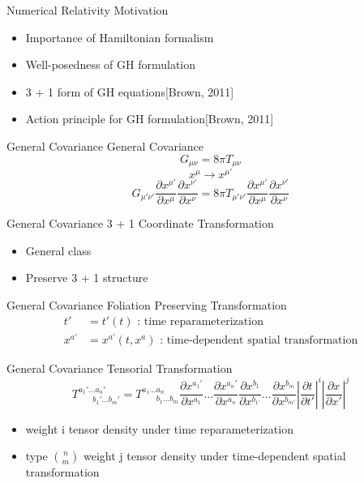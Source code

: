 \documentclass[xcolor=dvipsnames]{beamer}
\begin{document}
	\begin{frame}{Numerical Relativity}
		Motivation
		\begin{itemize}
			\item{Importance of Hamiltonian formalism}
			\item{Well-posedness of GH formulation}
			\pause
			\item{3 + 1 form of GH equations[Brown, 2011]}
			\item{Action principle for GH formulation[Brown, 2011]}
		\end{itemize}
	\end{frame}
	\begin{frame}{General Covariance}
		General Covariance
		\pause
		\Large
		\[
		G_{\mu\nu} = 8\pi T_{\mu\nu}
		\]
		\pause
		\[
		x^{\mu} \rightarrow x^{\mu'}
		\]
		\pause
		\[
		G_{\mu'\nu'}\frac{\partial x^{\mu'}}{\partial x^{\mu}}\frac{\partial x^{\nu'}}{\partial x^{\nu}} = 8 \pi T_{\mu'\nu'}\frac{\partial x^{\mu'}}{\partial x^{\mu}}\frac{\partial x^{\nu'}}{\partial x^{\nu}}
		\]
	\end{frame}
	\begin{frame}{General Covariance}
		3 + 1 Coordinate Transformation
		\begin{itemize}
			\item{General class}
			\item{Preserve 3 + 1 structure}
		\end{itemize}
	\end{frame}
	\begin{frame}{General Covariance}
		Foliation Preserving Transformation
		\pause
		\begin{align*}
		t' &= t'(t)\text{  : time reparameterization}\\
		x^{a'} &= x^{a'}(t, x^{a})\text{  : time-dependent spatial transformation}
	\end{align*}
	\end{frame}
	\begin{frame}{General Covariance}
		Tensorial Transformation
		\[
		T^{a_{1}'...a_{n}'}_{~~~~~~~~b_{1}'...b_{m}'} = T^{a_{1}...a_{n}}_{~~~~~~~~b_{1}...b_{m}}\frac{\partial x^{a_{1}'}}{\partial x^{a_{1}}}...\frac{\partial x^{a_{n}'}}{\partial x^{a_{n}}}\frac{\partial x^{b_{1}}}{\partial x^{b_{1'}}}...\frac{\partial x^{b_{m}}}{\partial x^{b_{m'}}}\left|\frac{\partial t}{\partial t'}\right|^{i}\left|\frac{\partial x}{\partial x'}\right|^{j} 
		\]
		\pause
		\begin{itemize}
			\item{weight i tensor density under time reparameterization}
			\item{type $n\choose m$ weight j tensor density under time-dependent spatial transformation}
		\end{itemize}
	\end{frame}
\end{document}
